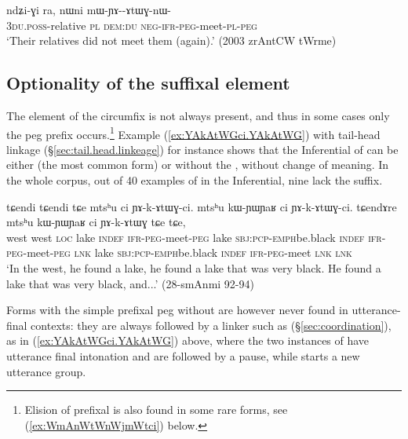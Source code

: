 \begin{exe}
\ex \label{ex:mWYAkAtWGnWci}
\gll  ndʑi-ɣi ra, nɯni mɯ-ɲɤ--ɤtɯɣ-nɯ- \\
\textsc{3du}.\textsc{poss}-relative \textsc{pl} \textsc{dem}:\textsc{du} \textsc{neg}-\textsc{ifr}-\textsc{peg}-meet-\textsc{pl}-\textsc{peg} \\
\glt `Their relatives did not meet them (again).' (2003 zrAntCW tWrme)
\end{exe}


\subsection{Optionality of the suffixal element} \label{sec:peg.circumfix.optionality}
The  element of the circumfix is not always present, and thus in some cases only the peg prefix  occurs.\footnote{
Elision of prefixal  is also found in some rare forms, see (\ref{ex:WmAnWtWnWjmWtci}) below. 
} Example (\ref{ex:YAkAtWGci.YAkAtWG}) with tail-head linkage (§\ref{sec:tail.head.linkeage}) for instance shows that the Inferential of  can be either  (the most common form) or  without the , without change of meaning.  In the whole corpus, out of 40 examples of  in the Inferential, nine lack the  suffix.

\begin{exe}
	\ex \label{ex:YAkAtWGci.YAkAtWG}
	\gll  tɕendi tɕendi tɕe mtsʰu ci ɲɤ-k-ɤtɯɣ-ci. mtsʰu kɯ-ɲɯ\redp{}ɲaʁ ci ɲɤ-k-ɤtɯɣ-ci. tɕendɤre mtsʰu kɯ-ɲɯ\redp{}ɲaʁ ci ɲɤ-k-ɤtɯɣ tɕe tɕe, \\
	west west \textsc{loc}  lake \textsc{indef} \textsc{ifr}-\textsc{peg}-meet-\textsc{peg}  lake \textsc{sbj}:\textsc{pcp}-\textsc{emph}\redp{}be.black \textsc{indef} \textsc{ifr}-\textsc{peg}-meet-\textsc{peg} \textsc{lnk} lake \textsc{sbj}:\textsc{pcp}-\textsc{emph}\redp{}be.black \textsc{indef} \textsc{ifr}-\textsc{peg}-meet \textsc{lnk} \textsc{lnk} \\
	\glt `In the west, he found a lake, he found a lake that was very black. He found a lake that was very black, and...' (28-smAnmi 92-94) 
\end{exe}

Forms with the simple prefixal peg  without  are however never found in utterance-final contexts: they are always followed by a linker such as  (§\ref{sec:coordination}), as in (\ref{ex:YAkAtWGci.YAkAtWG}) above, where the two instances of  have utterance final intonation and are followed by a pause, while  starts a new utterance group. 


